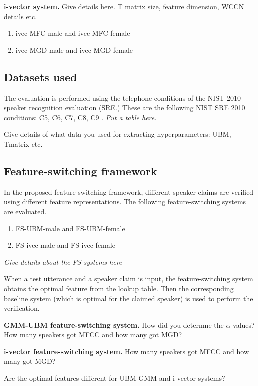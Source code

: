 \documentclass{article}
\begin{document}
\textbf{i-vector system.} Give details here. T matrix size, feature dimension,
WCCN details etc. 
\begin{enumerate}
\item ivec-MFC-male and ivec-MFC-female
\item ivec-MGD-male and ivec-MGD-female
\end{enumerate}

\subsection{Datasets used}
The evaluation is performed using the telephone conditions of the NIST 2010
speaker recognition evaluation (SRE.) These are the following NIST SRE 2010
conditions: C5, C6, C7, C8, C9 \cite{nist2010SRE}.
\textit{Put a table here.}

Give details of what data you used for extracting hyperparameters: UBM, Tmatrix
etc.


\subsection{Feature-switching framework}
In the proposed feature-switching framework, different speaker claims are
verified using different feature representations. The following
feature-switching systems are evaluated.
\begin{enumerate}
\item FS-UBM-male and FS-UBM-female
\item FS-ivec-male and FS-ivec-female
\end{enumerate}

\textit{Give details about the FS systems here}

When a test utterance and a speaker claim is input, the feature-switching system
obtains the optimal feature from the lookup table. Then the corresponding
baseline system (which is optimal for the claimed speaker) is used to perform the verification.

\textbf{GMM-UBM feature-switching system.}
How did you determne the $\alpha$ values?
How many speakers got MFCC and how many got MGD?

\textbf{i-vector feature-switching system.}
How many speakers got MFCC and how many got MGD?

Are the optimal features different for UBM-GMM and i-vector systems?















\end{document}
